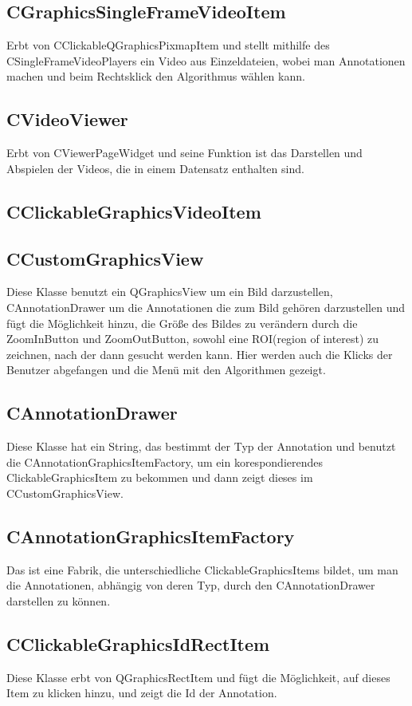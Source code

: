 \subsection*{CGraphicsSingleFrameVideoItem}
Erbt von CClickableQGraphicsPixmapItem und stellt mithilfe des CSingleFrameVideoPlayers ein Video aus Einzeldateien, wobei man Annotationen machen und beim Rechtsklick den Algorithmus wählen kann.

\subsection*{CVideoViewer}
Erbt von CViewerPageWidget und seine Funktion ist das Darstellen und Abspielen der Videos, die in einem Datensatz enthalten sind.

\subsection*{CClickableGraphicsVideoItem}


\subsection*{CCustomGraphicsView}
Diese Klasse benutzt ein QGraphicsView um ein Bild darzustellen, CAnnotationDrawer um die Annotationen die zum Bild gehören darzustellen und fügt die Möglichkeit hinzu, die Größe des Bildes zu verändern durch die ZoomInButton und ZoomOutButton, sowohl eine ROI(region of interest) zu zeichnen, nach der dann gesucht werden kann. Hier werden auch die Klicks der Benutzer abgefangen und die Menü mit den Algorithmen gezeigt.  

\subsection*{CAnnotationDrawer}
Diese Klasse hat ein String, das bestimmt der Typ der Annotation und benutzt die CAnnotationGraphicsItemFactory, um ein korespondierendes ClickableGraphicsItem zu bekommen und dann zeigt dieses im CCustomGraphicsView.
  
\subsection*{CAnnotationGraphicsItemFactory}
Das ist eine Fabrik, die unterschiedliche ClickableGraphicsItems bildet, um man die Annotationen, abhängig von deren Typ, durch den CAnnotationDrawer  darstellen zu können.

\subsection*{CClickableGraphicsIdRectItem}
Diese Klasse erbt von QGraphicsRectItem und fügt die Möglichkeit, auf dieses Item zu klicken hinzu, und zeigt die Id der Annotation.
 
